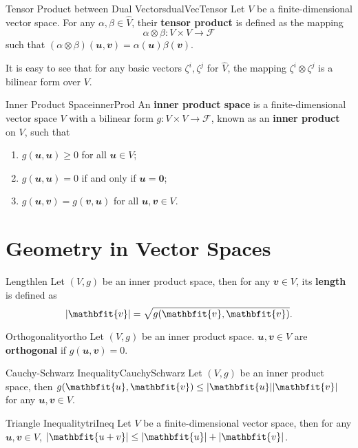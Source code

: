 \documentclass[math, code]{amznotes}
\theoremstyle{remark}
\newcommand{\zero}{\mathbf{0}}
\begin{document}
\begin{dfnbox}{Tensor Product between Dual Vectors}{dualVecTensor}
    Let $V$ be a finite-dimensional vector space. For any $\alpha, \beta \in \hat{V}$, their {\color{red} \textbf{tensor product}} is defined as the mapping 
    \begin{equation*}
        \alpha \otimes \beta \colon V \times V \to \mathcal{F}
    \end{equation*}
    such that $(\alpha \otimes \beta)(\mathbfit{u}, \mathbfit{v}) = \alpha(\mathbfit{u})\beta(\mathbfit{v})$.
\end{dfnbox}
It is easy to see that for any basic vectors $\zeta^i, \zeta^j$ for $\hat{V}$, the mapping $\zeta^i \otimes \zeta^j$ is a bilinear form over $V$.
\begin{dfnbox}{Inner Product Space}{innerProd}
    An {\color{red} \textbf{inner product space}} is a finite-dimensional vector space $V$ with a bilinear form $g \colon V \times V \to \mathcal{F}$, known as an {\color{red} \textbf{inner product}} on $V$, such that
    \begin{enumerate}
        \item $g(\mathbfit{u}, \mathbfit{u}) \geq 0$ for all $\mathbfit{u} \in V$;
        \item $g(\mathbfit{u}, \mathbfit{u}) = 0$ if and only if $\mathbfit{u} = \zero$;
        \item $g(\mathbfit{u}, \mathbfit{v}) = g(\mathbfit{v}, \mathbfit{u})$ for all $\mathbfit{u}, \mathbfit{v} \in V$.
    \end{enumerate}
\end{dfnbox}
\section{Geometry in Vector Spaces}
\begin{dfnbox}{Length}{len}
    Let $(V, g)$ be an inner product space, then for any $\mathbfit{v} \in V$, its {\color{red} \textbf{length}} is defined as 
    \begin{equation*}
        \abs{\mathbfit{v}} = \sqrt{g(\mathbfit{v}, \mathbfit{v})}.
    \end{equation*}
\end{dfnbox}
\begin{dfnbox}{Orthogonality}{ortho}
    Let $(V, g)$ be an inner product space. $\mathbfit{u}, \mathbfit{v} \in V$ are {\color{red} \textbf{orthogonal}} if $g(\mathbfit{u}, \mathbfit{v}) = 0$.
\end{dfnbox}
\begin{thmbox}{Cauchy-Schwarz Inequality}{CauchySchwarz}
    Let $(V, g)$ be an inner product space, then $g(\mathbfit{u}, \mathbfit{v}) \leq \abs{\mathbfit{u}}\abs{\mathbfit{v}}$ for any $\mathbfit{u}, \mathbfit{v} \in V$.
\end{thmbox}
\begin{corbox}{Triangle Inequality}{triIneq}
    Let $V$ be a finite-dimensional vector space, then for any $\mathbfit{u}, \mathbfit{v} \in V$, $\abs{\mathbfit{u + v}} \leq \abs{\mathbfit{u}} + \abs{\mathbfit{v}}$. 
\end{corbox}
\end{document}
